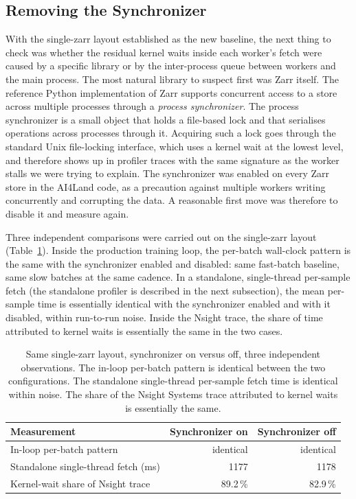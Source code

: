 \documentclass[12pt,a4paper]{article}
\begin{document}
\subsection{Removing the Synchronizer}

With the single-zarr layout established as the new baseline, the next thing to check was
whether the residual kernel waits inside each worker's fetch were caused by a specific
library or by the inter-process queue between workers and the main process. The most
natural library to suspect first was Zarr itself. The reference Python implementation of
Zarr supports concurrent access to a store across multiple processes through a
\emph{process synchronizer}. The process synchronizer is a small object that holds a
file-based lock and that serialises operations across processes through it. Acquiring such
a lock goes through the standard Unix file-locking interface, which uses a kernel wait at
the lowest level, and therefore shows up in profiler traces with the same signature as the
worker stalls we were trying to explain. The synchronizer was enabled on every Zarr store
in the AI4Land code, as a precaution against multiple workers writing concurrently and
corrupting the data. A reasonable first move was therefore to disable it and measure again.

Three independent comparisons were carried out on the single-zarr layout
(Table~\ref{tab:synch}). Inside the production training loop, the per-batch wall-clock
pattern is the same with the synchronizer enabled and disabled: same fast-batch baseline,
same slow batches at the same cadence. In a standalone, single-thread per-sample fetch
(the standalone profiler is described in the next subsection), the mean per-sample time is
essentially identical with the synchronizer enabled and with it disabled, within run-to-run
noise. Inside the Nsight trace, the share of time attributed to kernel waits is essentially
the same in the two cases.

\begin{table}[ht]
\centering
\small
\begin{tabular}{@{}lrr@{}}
\toprule
\textbf{Measurement} & \textbf{Synchronizer on} & \textbf{Synchronizer off} \\
\midrule
In-loop per-batch pattern              & identical & identical \\
Standalone single-thread fetch (ms)    & 1177      & 1178      \\
Kernel-wait share of Nsight trace      & 89.2\,\%  & 82.9\,\%  \\
\bottomrule
\end{tabular}
\caption{Same single-zarr layout, synchronizer on versus off, three independent
observations. The in-loop per-batch pattern is identical between the two configurations.
The standalone single-thread per-sample fetch time is identical within noise. The share of
the Nsight Systems trace attributed to kernel waits is essentially the same.}
\label{tab:synch}
\end{table}
\end{document}
